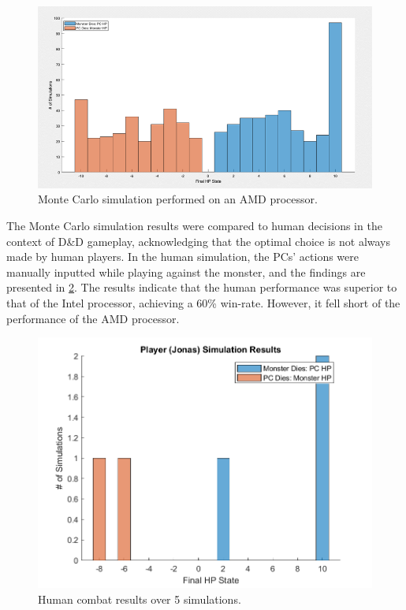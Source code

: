 \documentclass[letterpaper, 10 pt, conference]{ieeeconf}
\begin{document}
\begin{figure}[thb]
    \centering
    \includegraphics[width=\columnwidth]{figs/DND_MChist_AMD.png}
    \caption{Monte Carlo simulation performed on an AMD processor.}
    \label{fig:monte_carlo_hist_amd}
\end{figure}

The Monte Carlo simulation results were compared to human decisions in the context of D\&D gameplay, acknowledging that the optimal choice is 
not always made by human players. 
In the human simulation, the PCs' actions were manually inputted while playing against the monster, and the findings are presented in \cref{fig:dnd_player_hist}. 
The results indicate that the human performance was superior to that of the Intel processor, achieving a 60\% win-rate. 
However, it fell short of the performance of the AMD processor.

\begin{figure}[thb]
    \centering
    \includegraphics[scale = 0.5]{figs/DND_player_jonas_hist.png}
    \caption{Human combat results over 5 simulations.}
    \label{fig:dnd_player_hist}
\end{figure}
\end{document}
